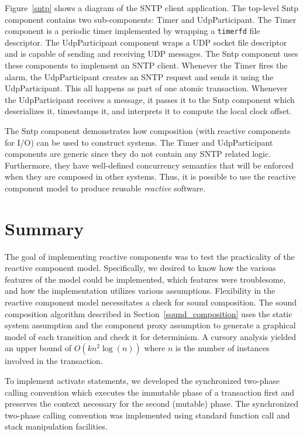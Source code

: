 Figure~\ref{sntp} shows a diagram of the SNTP client application.
The top-level Sntp component contains two sub-components:  Timer and UdpParticipant.
The Timer component is a periodic timer implemented by wrapping a \verb+timerfd+ file descriptor.
The UdpParticipant component wraps a UDP socket file descriptor and is capable of sending and receiving UDP messages.
The Sntp component uses these components to implement an SNTP client.
Whenever the Timer fires the alarm, the UdpParticipant creates an SNTP request and sends it using the UdpParticipant.
This all happens as part of one atomic transaction.
Whenever the UdpParticipant receives a message, it passes it to the Sntp component which deserializes it, timestamps it, and interprets it to compute the local clock offset.

The Sntp component demonstrates how composition (with reactive components for I/O) can be used to construct systems.
The Timer and UdpParticipant components are generic since they do not contain any SNTP related logic.
Furthermore, they have well-defined concurrency semantics that will be enforced when they are composed in other systems.
Thus, it is possible to use the reactive component model to produce reusable \emph{reactive} software.

\section{Summary}

The goal of implementing reactive components was to test the practicality of the reactive component model.
Specifically, we desired to know how the various features of the model could be implemented, which features were troublesome, and how the implementation utilizes various assumptions.
Flexibility in the reactive component model necessitates a check for sound composition.
The sound composition algorithm described in Section~\ref{sound_composition} uses the static system assumption and the component proxy assumption to generate a graphical model of each transition and check it for determinism.
A cursory analysis yielded an upper bound of $O(k n^2 \log (n))$ where $n$ is the number of instances involved in the transaction.

To implement activate statements, we developed the synchronized two-phase calling convention which executes the immutable phase of a transaction first and preserves the context necessary for the second (mutable) phase.
The synchronized two-phase calling convention was implemented using standard function call and stack manipulation facilities.

